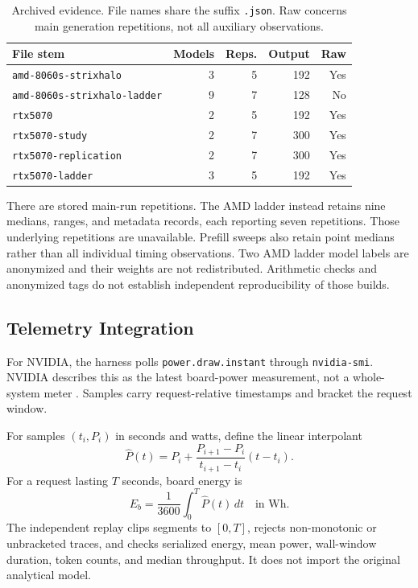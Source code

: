 \documentclass[conference]{IEEEtran}
\begin{document}
\begin{table}[t]
\caption{Archived evidence. File names share the suffix \texttt{.json}.
Raw concerns main generation repetitions, not all auxiliary observations.}
\label{tab:corpus}
\centering\footnotesize
\setlength{\tabcolsep}{3pt}
\begin{tabular}{lrrrr}
\toprule
File stem & Models & Reps. & Output & Raw\\
\midrule
\texttt{amd-8060s-strixhalo} & 3 & 5 & 192 & Yes\\
\texttt{amd-8060s-strixhalo-ladder} & 9 & 7 & 128 & No\\
\texttt{rtx5070} & 2 & 5 & 192 & Yes\\
\texttt{rtx5070-study} & 2 & 7 & 300 & Yes\\
\texttt{rtx5070-replication} & 2 & 7 & 300 & Yes\\
\texttt{rtx5070-ladder} & 3 & 5 & 192 & Yes\\
\bottomrule
\end{tabular}
\end{table}

There are \ReviewRawRepetitions{} stored main-run repetitions.
The AMD ladder instead retains nine medians, ranges, and metadata records,
each reporting seven repetitions. Those underlying repetitions are
unavailable. Prefill sweeps also retain point medians rather than all
individual timing observations. Two AMD ladder model labels are anonymized
and their weights are not redistributed. Arithmetic checks and anonymized
tags do not establish independent reproducibility of those builds.

\subsection{Telemetry Integration}
For NVIDIA, the harness polls \texttt{power.draw.instant} through
\texttt{nvidia-smi}. NVIDIA describes this as the latest board-power
measurement, not a whole-system meter \cite{nvidiasmi2026}.
Samples carry request-relative timestamps and bracket the request window.

For samples $(t_i,P_i)$ in seconds and watts, define the linear interpolant
\begin{equation}
\widehat{P}(t)=P_i+
 \frac{P_{i+1}-P_i}{t_{i+1}-t_i}(t-t_i).
\end{equation}
For a request lasting $T$ seconds, board energy is
\begin{equation}
E_b=\frac{1}{3600}\int_0^T\widehat{P}(t)\,dt
\quad\text{in Wh}. \label{eq:board}
\end{equation}
The independent replay clips segments to $[0,T]$, rejects non-monotonic
or unbracketed traces, and checks serialized energy, mean power,
wall-window duration, token counts, and median throughput.
It does not import the original analytical model.
\end{document}
